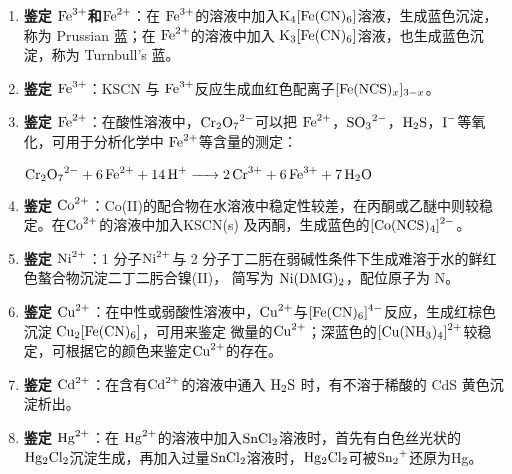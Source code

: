 \documentclass[
  10pt,
  twoside,
  openany,
  b5paper, %
  colorscheme = basic, %
  xits = false,
]{qyxf-book}
\begin{document}
\begin{enumerate}
	\item \textbf{鉴定 $\ce{Fe^3+}$和$\ce{Fe^2+}$}：在 $\ce{Fe^3+}$的溶液中加入$\ce{ K4[Fe(CN)6]}$溶液，生成蓝色沉淀，称为 Prussian 蓝；在 $\ce{Fe^2+}$的溶液中加入 $\ce{K3[Fe(CN)6]}$溶液，也生成蓝色沉淀，称为 Turnbull's 蓝。
	\item \textbf{鉴定 $\ce{Fe^3+}$}：KSCN 与 $\ce{Fe^3+}$反应生成血红色配离子$\ce{[Fe(NCS)_x]_{3-x}}$。
	\item \textbf{鉴定 $\ce{Fe^2+}$}：在酸性溶液中，$\ce{Cr2O7^2-}$可以把  $\ce{Fe^2+}$，$\ce{SO3^2-}$，$\ce{H2S}$，$\ce{I-}$等氧化，可用于分析化学中 $\ce{Fe^2+}$等含量的测定：
	\begin{center}
		$\ce{Cr2O7^2- + 6Fe^2+ + 14H+ -> 2Cr^3+ + 6Fe^3+ + 7H2O}$
	\end{center}
	
	\item \textbf{鉴定 $\ce{Co^2+}$}：Co(II)的配合物在水溶液中稳定性较差，在丙酮或乙醚中则较稳定。在$\ce{Co^2+}$的溶液中加入KSCN(s)
	及丙酮，生成蓝色的$\ce{[Co(NCS)4]^2-}$。
	\item \textbf{鉴定 $\ce{Ni^2+}$}：1 分子$\ce{Ni^2+}$与 2 分子丁二肟在弱碱性条件下生成难溶于水的鲜红色螯合物沉淀二丁二肟合镍(II)，
	简写为 $\ce{Ni(DMG)2}$，配位原子为 N。
	\item \textbf{鉴定 $\ce{Cu^2+}$}：在中性或弱酸性溶液中，$\ce{Cu^2+}$与$\ce{[Fe(CN)6]^4-}$反应，生成红棕色沉淀 $\ce{Cu2[Fe(CN)6]}$，可用来鉴定
	微量的$\ce{Cu^2+}$；深蓝色的$\ce{[Cu(NH3)4]^2+}$较稳定，可根据它的颜色来鉴定$\ce{Cu^2+}$的存在。
	\item \textbf{鉴定 $\ce{Cd^2+}$}：在含有$\ce{Cd^2+}$的溶液中通入 $\ce{H2S}$ 时，有不溶于稀酸的 CdS 黄色沉淀析出。
	\item \textbf{鉴定 $\ce{Hg^2+}$}：在  $\ce{Hg^2+}$的溶液中加入$ \ce{SnCl2}$溶液时，首先有白色丝光状的 $\ce{Hg2Cl2}$沉淀生成，再加入过量$\ce{SnCl2}$溶液时，$\ce{Hg2Cl2}$可被$ \ce{Sn2+}$还原为Hg。
\end{enumerate}
\end{document}
